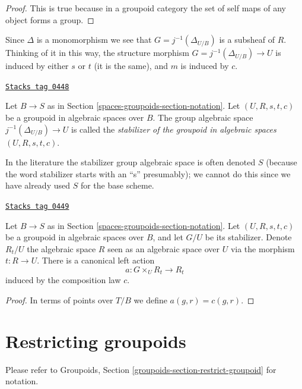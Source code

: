 \begin{proof}
This is true because in a groupoid category the
set of self maps of any object forms a group.
\end{proof}

Since $\Delta$ is a monomorphism we see that $G = j^{-1}(\Delta_{U/B})$ is a
subsheaf of $R$. Thinking of it in this way, the structure morphism
$G = j^{-1}(\Delta_{U/B}) \to U$ is induced by either $s$ or $t$
(it is the same), and $m$ is induced by $c$.

\begin{definition}
\label{spaces-groupoids-definition-stabilizer-groupoid}
\href{https://stacks.math.columbia.edu/tag/0448}{\texttt{Stacks tag 0448}}

Let $B \to S$ as in Section \ref{spaces-groupoids-section-notation}.
Let $(U, R, s, t, c)$ be a groupoid in algebraic spaces over $B$.
The group algebraic space $j^{-1}(\Delta_{U/B}) \to U$ is called the
{\it stabilizer of the groupoid in algebraic spaces $(U, R, s, t, c)$}.
\end{definition}

In the literature the stabilizer group algebraic space is often denoted $S$
(because the word stabilizer starts with an ``s'' presumably);
we cannot do this since we have already used $S$ for the base scheme.

\begin{lemma}
\label{spaces-groupoids-lemma-groupoid-action-stabilizer}
\href{https://stacks.math.columbia.edu/tag/0449}{\texttt{Stacks tag 0449}}

Let $B \to S$ as in Section \ref{spaces-groupoids-section-notation}.
Let $(U, R, s, t, c)$ be a groupoid in algebraic spaces over $B$, and let
$G/U$ be its stabilizer. Denote $R_t/U$ the algebraic space $R$ seen as an
algebraic space over $U$ via the morphism $t : R \to U$. There is a
canonical left action
$$
a : G \times_U R_t \longrightarrow R_t
$$
induced by the composition law $c$.
\end{lemma}

\begin{proof}
In terms of points over $T/B$ we define $a(g, r) = c(g, r)$.
\end{proof}

\section{Restricting groupoids}
\label{spaces-groupoids-section-restrict-groupoid}
Please refer to
Groupoids, Section \ref{groupoids-section-restrict-groupoid}
for notation.

